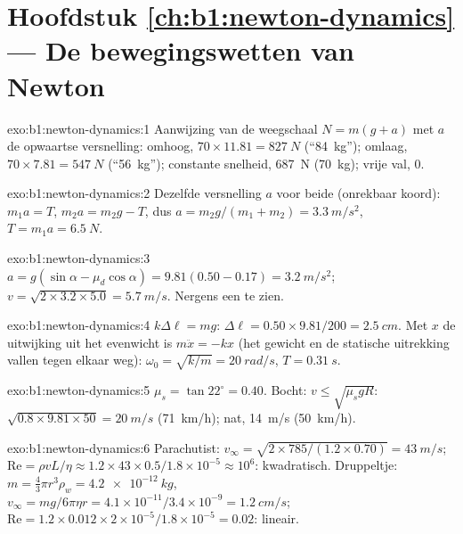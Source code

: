 \section*{Hoofdstuk \ref{ch:b1:newton-dynamics} --- De bewegingswetten van Newton}

\begin{solution}{exo:b1:newton-dynamics:1}
Aanwijzing van de weegschaal $N = m(g + a)$ met $a$ de opwaartse versnelling: omhoog,
$70 \times 11.81 = \qty{827}{N}$ (``\qty{84}{kg}''); omlaag, $70 \times 7.81 =
\qty{547}{N}$ (``\qty{56}{kg}''); constante snelheid, \qty{687}{N}
(\qty{70}{kg}); vrije val, $0$.
\end{solution}

\begin{solution}{exo:b1:newton-dynamics:2}
Dezelfde versnelling $a$ voor beide (onrekbaar koord): $m_1a = T$,
$m_2a = m_2g - T$, dus $a = m_2g/(m_1 + m_2) = \qty{3.3}{m/s^2}$,
$T = m_1a = \qty{6.5}{N}$.
\end{solution}

\begin{solution}{exo:b1:newton-dynamics:3}
$a = g(\sin\alpha - \mu_d\cos\alpha) = 9.81(0.50 - 0.17) = \qty{3.2}{m/s^2}$;
$v = \sqrt{2 \times 3.2 \times 5.0} = \qty{5.7}{m/s}$. Nergens een  te zien.
\end{solution}

\begin{solution}{exo:b1:newton-dynamics:4}
$k\Delta\ell = mg$: $\Delta\ell = 0.50 \times 9.81/200 = \qty{2.5}{cm}$.
Met $x$ de uitwijking uit het evenwicht is $m\ddot x = -kx$ (het gewicht
en de statische uitrekking vallen tegen elkaar weg): $\omega_0 = \sqrt{k/m} = \qty{20}{rad/s}$,
$T = \qty{0.31}{s}$.
\end{solution}

\begin{solution}{exo:b1:newton-dynamics:5}
$\mu_s = \tan 22^\circ = 0.40$. Bocht: $v \leq \sqrt{\mu_sgR}$: $\sqrt{0.8
\times 9.81 \times 50} = \qty{20}{m/s}$ (\qty{71}{km/h}); nat,
\qty{14}{m/s} (\qty{50}{km/h}).
\end{solution}

\begin{solution}{exo:b1:newton-dynamics:6}
Parachutist: $v_\infty = \sqrt{2 \times 785/(1.2 \times 0.70)} = \qty{43}{m/s}$;
$\mathrm{Re} = \rho vL/\eta \approx 1.2 \times 43 \times 0.5/1.8\times10^{-5}
\approx 10^6$: kwadratisch. Druppeltje: $m = \tfrac43\pi r^3\rho_w = \qty{4.2e-12}{kg}$,
$v_\infty = mg/6\pi\eta r = 4.1\times10^{-11}/3.4\times10^{-9} = \qty{1.2}{cm/s}$;
$\mathrm{Re} = 1.2 \times 0.012 \times 2\times10^{-5}/1.8\times10^{-5} = 0.02$:
lineair.
\end{solution}

